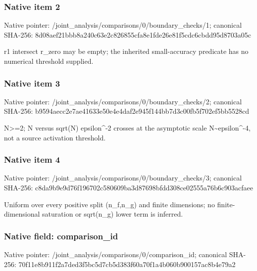 \documentclass[10pt,a4paper]{article}
\begin{document}
\subsubsection{Native item 2}
Native pointer: /joint\_\allowbreak{}analysis/comparisons/0/boundary\_\allowbreak{}checks/1; canonical SHA-256: 8d08aef21bbb8a240c63e2c826855cfa8e1fde26e81f5cdc6cbdd95d8703a05c

\begingroup\raggedright\sloppy r1 intersect r\_\allowbreak{}zero may be empty;\allowbreak{} the inherited small-accuracy predicate has no numerical threshold supplied.\par\endgroup

\subsubsection{Native item 3}
Native pointer: /joint\_\allowbreak{}analysis/comparisons/0/boundary\_\allowbreak{}checks/2; canonical SHA-256: b9594aecc2e7ae41633e50e4e4daf2e945f144bb7d3c00fb5f702ef5bb5528cd

\begingroup\raggedright\sloppy N>=\allowbreak{}2;\allowbreak{} N versus sqrt(N) epsilon\textasciicircum{}-2 crosses at the asymptotic scale N\textasciitilde{}epsilon\textasciicircum{}-4,\allowbreak{} not a source activation threshold.\par\endgroup

\subsubsection{Native item 4}
Native pointer: /joint\_\allowbreak{}analysis/comparisons/0/boundary\_\allowbreak{}checks/3; canonical SHA-256: c8da9b9e9d76f196702c580609ba3d87698bfdd308ce02555a76b6c903acfaee

\begingroup\raggedright\sloppy Uniform over every positive split (n\_\allowbreak{}f,\allowbreak{}n\_\allowbreak{}g) and finite dimensions;\allowbreak{} no finite-dimensional saturation or sqrt(n\_\allowbreak{}g) lower term is inferred.\par\endgroup

\subsubsection{Native field: comparison\_\allowbreak{}id}
Native pointer: /joint\_\allowbreak{}analysis/comparisons/0/comparison\_\allowbreak{}id; canonical SHA-256: 70f11e8b911f2a7ded3f5bc5d7cb5d383f60a70f1a4b060b900157ac8b4e79a2
\end{document}
